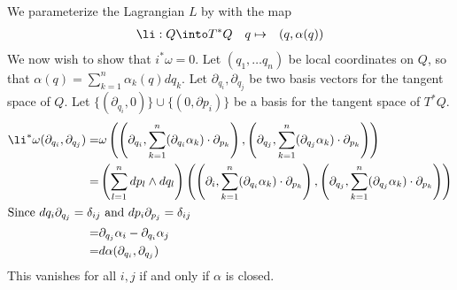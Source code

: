 

    We parameterize the Lagrangian $L$ by with the map 
    \begin{align*}
        \li: Q\into& T^*Q &&
        q\mapsto&(q, \alpha(q))
    \end{align*}
    We now wish to show that $i^*\omega=0$. 
    Let $(q_1, \ldots q_n)$ be local coordinates on $Q$, so that $\alpha(q)=\sum_{k=1}^n \alpha_k(q)dq_{k}$. 
    Let $\partial_{q_i}, \partial_{q_j}$ be two basis vectors for the tangent space of $Q$. 
    Let $\{(\partial_{q_i}, 0)\}\cup\{(0, \partial p_i)\}$ be a basis for the tangent space of $T^*Q$.
    \begin{align*}
        \li^*\omega(\partial_{q_i}, \partial_{q_j})=& \omega \left(\left(\partial_{q_i}, \sum_{k=1}^n (\partial_{q_i}\alpha_k )\cdot \partial_{p_k}\right), \left(\partial_{q_j}, \sum_{k=1}^n (\partial_{q_j} \alpha_k)\cdot \partial_{p_k}\right)\right)\\
        =&\left( \sum_{l=1}^n dp_l \wedge dq_l\right) \left(\left(\partial_i, \sum_{k=1}^n (\partial_{q_i}\alpha_k )\cdot \partial_{p_k}\right), \left(\partial_{q_j}, \sum_{k=1}^n (\partial_{q_j} \alpha_k )\cdot\partial_{p_k}\right)\right)\\
        \intertext{Since $dq_i\partial_{q_j}=\delta_{ij}$ and $dp_i\partial_{p_j}=\delta_{ij}$}
        =& \partial_{q_j} \alpha_i - \partial_{q_i} \alpha_j\\
        =& d\alpha(\partial_{q_i}, \partial_{q_j})
    \end{align*}
    This vanishes for all $i, j$ if and only if $\alpha$ is closed. 

